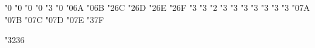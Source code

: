 \mathchardef \Finv   "0
\mathchardef \Game   "0
\mathchardef \mho   "0
\mathchardef \eth   "0
\mathchardef \eqsim   "3
\mathchardef \beth   "0
\mathchardef \gimel   "0\amsbfam 6A
\mathchardef \daleth   "0\amsbfam 6B
\mathchardef \lessdot   "2\amsbfam 6C
\mathchardef \gtrdot   "2\amsbfam 6D
\mathchardef \ltimes   "2\amsbfam 6E
\mathchardef \rtimes   "2\amsbfam 6F
\mathchardef \shortmid   "3
\mathchardef \shortparallel   "3
\mathchardef \smallsetminus   "2
\mathchardef \thicksim   "3
\mathchardef \thickapprox   "3
\mathchardef \approxeq   "3
\mathchardef \precapprox   "3
\mathchardef \succapprox   "3
\mathchardef \curvearrowleft   "3
\mathchardef \curvearrowright   "3
\mathchardef \digamma   "0\amsbfam 7A
\mathchardef \varkappa   "0\amsbfam 7B
\mathchardef \Bbbk   "0\amsbfam 7C
\mathchardef \hslash   "0\amsbfam 7D
\mathchardef \hbar   "0\amsbfam 7E
\mathchardef \backepsilon   "3\amsbfam 7F


\def\joinrel{\mathrel{\mkern-2.5mu}}  %

\let\circledplus\oplus
\let\circledminus\ominus
\let\circledtimes\otimes
\let\circledslash\oslash
\let\circleddot\odot


\def\scalebig#1#2{{\left#1\vbox to#2\fontdimen6\textfont3{}%
                   \kern-\nulldelimiterspace\right.}}
\def\big#1{\scalebig{#1}{.85}}  
\def\Big#1{\scalebig{#1}{1.15}} 
\def\bigg#1{\scalebig{#1}{1.45}}
\def\Bigg#1{\scalebig{#1}{1.75}}


\mathchardef \notchar  "3236

\def\not#1{%
  \ifx\TeX\relax \noexpand\not \else %
  \ifx #1<\nless \else
  \ifx #1>\ngtr \else
  \begingroup\escapechar=-1\xdef\tmpn{\string#1}\endgroup
  \expandafter\ifx \csname not\tmpn\endcsname \relax
     \expandafter\ifx \csname n\tmpn\endcsname \relax
         \mathrel{\mathord{\notchar}\mathord{#1}}%
     \else \csname n\tmpn\endcsname \fi
  \else \csname not\tmpn\endcsname \fi
  \fi\fi\fi}

\endinput

